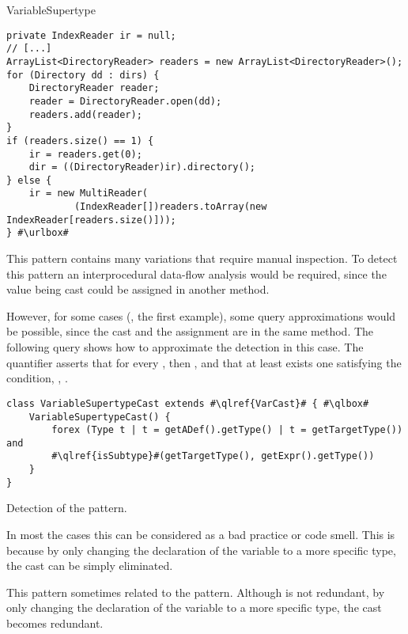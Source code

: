 \begin{pattern}{VariableSupertype}
\begin{verbatim}
private IndexReader ir = null;
// [...]
ArrayList<DirectoryReader> readers = new ArrayList<DirectoryReader>();
for (Directory dd : dirs) {
    DirectoryReader reader;
    reader = DirectoryReader.open(dd);
    readers.add(reader);
}
if (readers.size() == 1) {
    ir = readers.get(0);
    dir = ((DirectoryReader)ir).directory();
} else {
    ir = new MultiReader(
            (IndexReader[])readers.toArray(new IndexReader[readers.size()]));
} #\urlbox#
\end{verbatim}


\detection{}
This pattern contains many variations that require manual inspection.
To detect this pattern an interprocedural data-flow analysis would be required,
since the value being cast could be assigned in another method.

However, for some cases (\eg{}, the first example),
some query approximations would be possible,
since the cast and the assignment are in the same method.
The following query shows how to approximate the detection in this case.
The  quantifier asserts that for every ,
then ,
and that at least exists one  satisfying the condition,
\ie{}, .

\begin{listing}
\begin{verbatim}
class VariableSupertypeCast extends #\qlref{VarCast}# { #\qlbox#
	VariableSupertypeCast() {
		forex (Type t | t = getADef().getType() | t = getTargetType()) and
		#\qlref{isSubtype}#(getTargetType(), getExpr().getType())
	}
}
\end{verbatim}
\caption{Detection of the \thisp{} pattern.}
\label{lst:ql:VariableSupertype}
\end{listing}


\issues{}
In most the cases this can be considered as a bad practice or code smell.
This is because by only changing the declaration of the variable
to a more specific type, the cast can be simply eliminated.

This pattern sometimes related to the  pattern.
Although \thisp{} is not redundant,
by only changing the declaration of the variable to a more specific type,
the cast becomes redundant.

\end{pattern}
